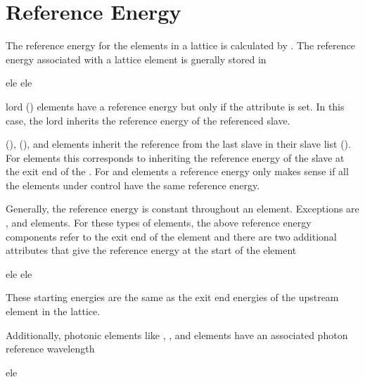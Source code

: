 \section{Reference Energy}
\label{s:ref.energy}

The reference energy for the elements in a lattice is calculated by
.
The reference energy associated with a lattice element is gnerally stored in
\begin{example}
  ele%
  ele%
\end{example}

 lord () elements have a
reference energy but only if the  attribute is set. In
this case, the  lord inherits the reference energy of
the referenced slave.

 (),  (), and
 elements inherit the reference from the last slave in
their slave list (). For  elements
this corresponds to inheriting the reference energy of the slave at
the exit end of the . For  and 
elements a reference energy only makes sense if all the elements under
control have the same reference energy.

Generally, the reference energy is constant throughout an
element. Exceptions are ,  and 
elements. For these types of elements, the above reference energy
components refer to the exit end of the element and there are two
additional attributes that give the reference energy at the start of
the element
\begin{example}
  ele%
  ele%
\end{example}
These starting energies are the same as the exit end energies of the upstream element in the lattice.

Additionally, photonic elements like , ,
 and  elements have an associated photon reference wavelength
\begin{example}
  ele%
\end{example}


